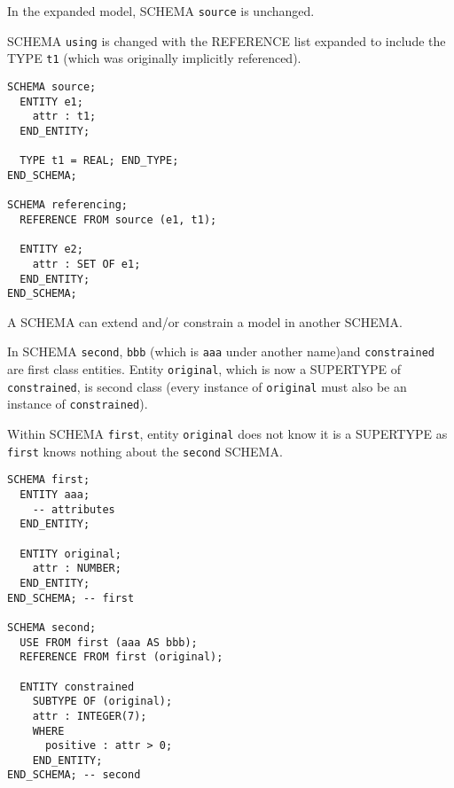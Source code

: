 \begin{remarks}
\remintro


In the expanded model, SCHEMA \texttt{source} is unchanged.

SCHEMA \texttt{using} is changed with the REFERENCE list expanded
to include the TYPE \texttt{t1} (which was originally implicitly
referenced).

\remend
\end{remarks}


\begin{verbatim}
SCHEMA source;
  ENTITY e1;
    attr : t1;
  END_ENTITY;

  TYPE t1 = REAL; END_TYPE;
END_SCHEMA;

SCHEMA referencing;
  REFERENCE FROM source (e1, t1);

  ENTITY e2;
    attr : SET OF e1;
  END_ENTITY;
END_SCHEMA;
\end{verbatim}


\begin{remarks}
\remintro


A SCHEMA can extend and/or constrain a model in another SCHEMA.

In SCHEMA \texttt{second}, \texttt{bbb} (which is \texttt{aaa} under 
another name)and \texttt{constrained} are first class entities.
Entity \texttt{original}, which is now a SUPERTYPE of \texttt{constrained},
is second class (every instance of \texttt{original} must also be an
instance of \texttt{constrained}).

Within SCHEMA \texttt{first}, entity \texttt{original} does not know it is
a SUPERTYPE as \texttt{first} knows nothing about the \texttt{second} SCHEMA.

\remend
\end{remarks}


\begin{verbatim}
SCHEMA first;
  ENTITY aaa;
    -- attributes
  END_ENTITY;

  ENTITY original;
    attr : NUMBER;
  END_ENTITY;
END_SCHEMA; -- first

SCHEMA second;
  USE FROM first (aaa AS bbb);
  REFERENCE FROM first (original);

  ENTITY constrained
    SUBTYPE OF (original);
    attr : INTEGER(7);
    WHERE
      positive : attr > 0;
    END_ENTITY;
END_SCHEMA; -- second
\end{verbatim}

